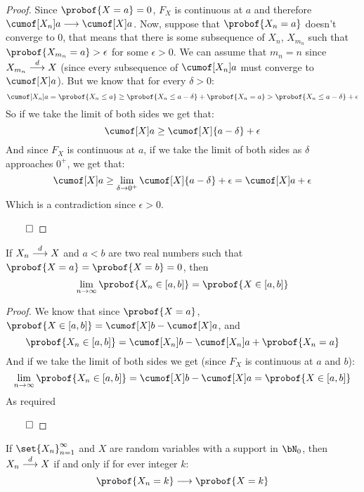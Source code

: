 \begin{proof}

	Since $\probof{X=a}=0$, $F_X$ is continuous at $a$ and therefore $\cumof[X_n]a\longrightarrow\cumof[X]a$.
	Now, suppose that $\probof{X_n=a}$ doesn't converge to $0$, that means that there is some subsequence of $X_n$, $X_{m_n}$
	such that $\probof{X_{m_n}=a}>\epsilon$ for some $\epsilon>0$.
	We can assume that $m_n=n$ since $X_{m_n}\mathrel{\overset d\longrightarrow} X$ (since every subsequence of $\cumof[X_n]a$ must converge to $\cumof[X]a$).
	But we know that for every $\delta>0$:
	\[ \cumof[X_n]a = \probof{X_n\leq a} \geq \probof{X_n\leq a-\delta} + \probof{X_n=a} > \probof{X_n\leq a-\delta} + \epsilon \]
	So if we take the limit of both sides we get that:
	\[ \cumof[X]a \geq \cumof[X]{a-\delta} + \epsilon \]
	And since $F_X$ is continuous at $a$, if we take the limit of both sides as $\delta$ approaches $0^+$, we get that:
	\[ \cumof[X]a \geq \lim_{\delta\to0^+}\cumof[X]{a-\delta} + \epsilon = \cumof[X]a + \epsilon \]
	Which is a contradiction since $\epsilon>0$.

	\hfill$\qed$

\end{proof}

\newpage
\begin{prop*}

	If $X_n\mathrel{\overset d\longrightarrow} X$ and $a<b$ are two real numbers such that $\probof{X=a}=\probof{X=b}=0$, then
	\[ \lim_{n\to\infty}\probof{X_n\in[a,b]} = \probof{X\in[a,b]} \]

\end{prop*}

\begin{proof}

	We know that since $\probof{X=a}$, $\probof{X\in[a,b]}=\cumof[X]b-\cumof[X]a$, and
	\[ \probof{X_n\in[a,b]} = \cumof[X_n]b - \cumof[X_n]a + \probof{X_n=a} \]
	And if we take the limit of both sides we get (since $F_X$ is continuous at $a$ and $b$):
	\[ \lim_{n\to\infty}\probof{X_n\in[a,b]} = \cumof[X]b - \cumof[X]a = \probof{X\in[a,b]} \]
	As required

	\hfill$\qed$

\end{proof}

\begin{prop*}

	If $\set{X_n}_{n=1}^\infty$ and $X$ are random variables with a support in $\bN_0$, then $X_n\mathrel{\overset d\longrightarrow} X$ if and only if for ever integer $k$:
	\[ \probof{X_n=k}\longrightarrow\probof{X=k} \]

\end{prop*}


